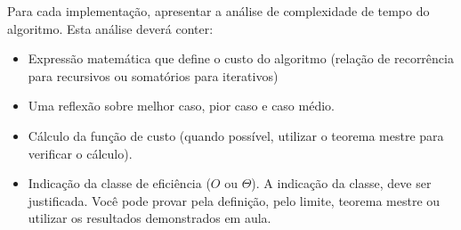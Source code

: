\documentclass{article}
\begin{document}
Para cada implementação, apresentar a análise de complexidade de tempo do algoritmo. Esta análise deverá conter:

\begin{itemize}
    \item Expressão matemática que define o custo do algoritmo (relação de recorrência para recursivos ou somatórios para iterativos) 
    \item Uma reflexão sobre melhor caso, pior caso e caso médio.
    \item Cálculo da função de custo (quando possível, utilizar o teorema mestre para verificar o cálculo).
    \item Indicação da classe de eficiência ($O$ ou $\Theta$). A indicação da classe, deve ser justificada. Você pode provar pela definição, pelo limite, teorema mestre ou utilizar os resultados demonstrados em aula.
\end{itemize}



%
%
\end{document}
